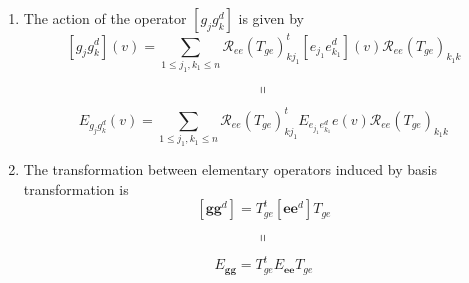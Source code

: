 \documentclass[aps,preprint]{revtex4}%
\begin{document}
\begin{enumerate}
\item The action of the operator $\left[  g_{j}g_{k}^{d}\right]  $ is given by%
\begin{equation}
\left[  g_{j}g_{k}^{d}\right]  \left(  v\right)  =\sum_{1\leq j_{1},k_{1}\leq
n}\mathcal{R}_{ee}\left(  T_{ge}\right)  _{kj_{1}}^{t}\left[  e_{j_{1}%
}e_{k_{1}}^{d}\right]  \left(  v\right)  \mathcal{R}_{ee}\left(
T_{ge}\right)  _{k_{1}k}%
\end{equation}%
\begin{equation}
\shortparallel
\end{equation}%
\begin{equation}
E_{g_{j}g_{k}^{d}}\left(  v\right)  =\sum_{1\leq j_{1},k_{1}\leq n}%
\mathcal{R}_{ee}\left(  T_{ge}\right)  _{kj_{1}}^{t}E_{e_{j_{1}}e_{k_{1}}^{d}%
}e\left(  v\right)  \mathcal{R}_{ee}\left(  T_{ge}\right)  _{k_{1}k}%
\end{equation}


\item The transformation between elementary operators induced by basis
transformation is
\begin{equation}
\left[  \boldsymbol{gg}^{d}\right]  =T_{ge}^{t}\left[  \boldsymbol{ee}%
^{d}\right]  T_{ge}%
\end{equation}%
\begin{equation}
\shortparallel
\end{equation}%
\begin{equation}
E_{\boldsymbol{gg}}=T_{ge}^{t}E_{\boldsymbol{ee}}T_{ge}%
\end{equation}



\end{enumerate}
\end{document}
